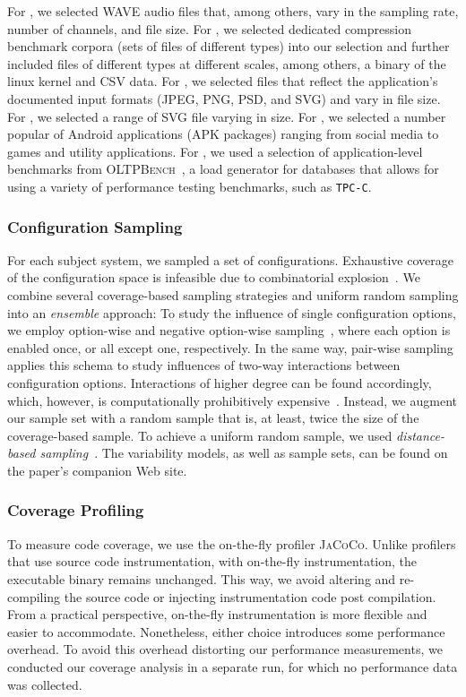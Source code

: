 For \jumper, we selected WAVE audio files that, among others, vary in the sampling rate, number of channels, and file size. For \kanzi, we selected dedicated compression benchmark corpora (sets of files of different types) into our selection and further included files of different types at different scales, among others, a binary of the linux kernel and CSV data. For \dconvert, we selected files that reflect the application’s documented input formats (JPEG, PNG, PSD, and SVG) and vary in file size. For \batik, we selected a range of SVG file varying in size. For \jadx, we selected a number popular of Android applications (APK packages) ranging from social media to games and utility applications. For \htwo, we used a selection of application-level benchmarks from \textsc{OLTPBench}~\cite{difallah_oltp_2013}, a load generator for databases that allows for using a variety of performance testing benchmarks, such as \texttt{TPC-C}. 

\subsubsection{Configuration Sampling}\label{sec:sampling}
For each subject system, we sampled a set of configurations. Exhaustive coverage of the configuration space is infeasible due to combinatorial explosion~\cite{henardCombining2015}. We combine several coverage-based sampling strategies and uniform random sampling into an \emph{ensemble} approach: 
To study the influence of single configuration options, we employ option-wise and negative option-wise sampling~\cite{siegmundPerformanceinfluenceModelsHighly2015}, where each option is enabled once, or all except one, respectively. In the same way, pair-wise sampling applies this schema to study influences of two-way interactions between configuration options. Interactions of higher degree can be found accordingly, which, however, is computationally prohibitively expensive~\cite{henardCombining2015}. Instead, we augment our sample set with a random sample that is, at least, twice the size of the coverage-based sample. To achieve a uniform random sample, we used \emph{distance-based sampling}~\cite{kaltenecker_distance-based_2019}. The variability models, as well as sample sets, can be found on the paper's companion Web site.
	
\subsubsection{Coverage Profiling}\label{sec:profiling}
To measure code coverage, we use the on-the-fly profiler \textsc{JaCoCo}. Unlike profilers that use source code instrumentation, with on-the-fly instrumentation, the executable binary remains unchanged. This way, we avoid altering and re-compiling the source code or injecting instrumentation code post compilation. From a practical perspective, on-the-fly instrumentation is more flexible and easier to accommodate. Nonetheless, either choice introduces some performance overhead. To avoid this overhead distorting our performance measurements, we conducted our coverage analysis in a separate run, for which no performance data was collected. 	
	

